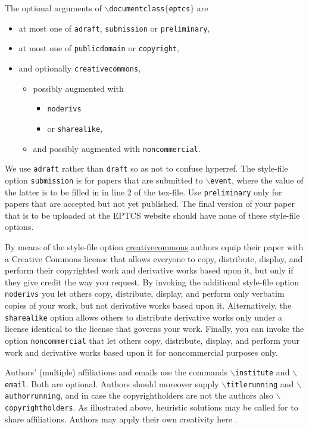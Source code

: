 \documentclass[submission,copyright,creativecommons]{eptcs}
\begin{document}
The optional arguments of {\tt $\backslash$documentclass$\{$eptcs$\}$} are
\begin{itemize}
\item at most one of
{\tt adraft},
{\tt submission} or
{\tt preliminary},
\item at most one of {\tt publicdomain} or {\tt copyright},
\item and optionally {\tt creativecommons},
  \begin{itemize}
  \item possibly augmented with
    \begin{itemize}
    \item {\tt noderivs}
    \item or {\tt sharealike},
    \end{itemize}
  \item and possibly augmented with {\tt noncommercial}.
  \end{itemize}
\end{itemize}
We use {\tt adraft} rather than {\tt draft} so as not to confuse hyperref.
The style-file option {\tt submission} is for papers that are
submitted to {\tt $\backslash$event}, where the value of the latter is
to be filled in in line 2 of the tex-file. Use {\tt preliminary} only
for papers that are accepted but not yet published. The final version
of your paper that is to be uploaded at the EPTCS website should have
none of these style-file options.

By means of the style-file option
\href{http://creativecommons.org/licenses/}{creativecommons}
authors equip their paper with a Creative Commons license that allows
everyone to copy, distribute, display, and perform their copyrighted
work and derivative works based upon it, but only if they give credit
the way you request. By invoking the additional style-file option {\tt
noderivs} you let others copy, distribute, display, and perform only
verbatim copies of your work, but not derivative works based upon
it. Alternatively, the {\tt sharealike} option allows others to
distribute derivative works only under a license identical to the
license that governs your work. Finally, you can invoke the option
{\tt noncommercial} that let others copy, distribute, display, and
perform your work and derivative works based upon it for
noncommercial purposes only.

Authors' (multiple) affiliations and emails use the commands
{\tt $\backslash$institute} and {\tt $\backslash$email}.
Both are optional.
Authors should moreover supply
{\tt $\backslash$titlerunning} and {\tt $\backslash$authorrunning},
and in case the copyrightholders are not the authors also
{\tt $\backslash$copyrightholders}.
As illustrated above, heuristic solutions may be called for to share
affiliations. Authors may apply their own creativity here \cite{multipleauthors}.
\end{document}
